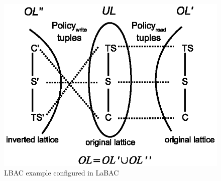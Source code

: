  \begin{figure}
 	\centering
 	\includegraphics[width=.4\textwidth]{ABAC16/lbac-labac-example}
 	\caption{LBAC example configured in LaBAC}
 	\label{fig:lbac-labac-example}
 \end{figure}